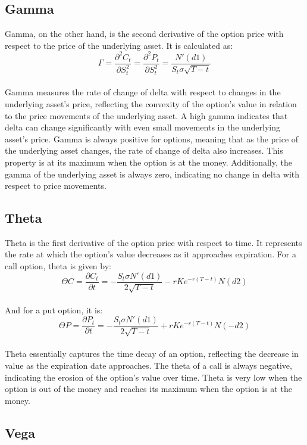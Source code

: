 \documentclass[a4paper,10pt]{article}
\begin{document}
    \subsection*{Gamma}
        \noindent Gamma, on the other hand, is the second derivative of the option price with respect to the price of the underlying asset. It is calculated as:\\\[ \Gamma = \frac{\partial^2 C_t}{\partial S_t^2} = \frac{\partial^2 P_t}{\partial S_t^2} = \frac{N'(d1)}{S_t \sigma \sqrt{T-t}} \]\\ Gamma measures the rate of change of delta with respect to changes in the underlying asset's price, reflecting the convexity of the option's value in relation to the price movements of the underlying asset. A high gamma indicates that delta can change significantly with even small movements in the underlying asset's price. Gamma is always positive for options, meaning that as the price of the underlying asset changes, the rate of change of delta also increases. This property is at its maximum when the option is at the money. Additionally, the gamma of the underlying asset is always zero, indicating no change in delta with respect to price movements. \\
    
    \subsection*{Theta}
        \noindent Theta is the first derivative of the option price with respect to time. It represents the rate at which the option's value decreases as it approaches expiration. For a call option, theta is given by:\\\[ \Theta C = \frac{\partial C_t}{\partial t} = -\frac{S_t \sigma N'(d1)}{2 \sqrt{T-t}} - r K e^{-r(T-t)} N(d2) \]\\ And for a put option, it is:\\\[ \Theta P = \frac{\partial P_t}{\partial t} = -\frac{S_t \sigma N'(d1)}{2 \sqrt{T-t}} + r K e^{-r(T-t)} N(-d2) \]\\ Theta essentially captures the time decay of an option, reflecting the decrease in value as the expiration date approaches. The theta of a call is always negative, indicating the erosion of the option's value over time. Theta is very low when the option is out of the money and reaches its maximum when the option is at the money. \\
    
    \subsection*{Vega}   
    
\end{document}
